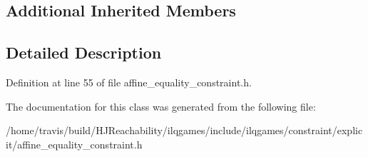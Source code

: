 \subsection*{Additional Inherited Members}


\subsection{Detailed Description}


Definition at line 55 of file affine\+\_\+equality\+\_\+constraint.\+h.



The documentation for this class was generated from the following file\+:\begin{DoxyCompactItemize}
\item 
/home/travis/build/\+H\+J\+Reachability/ilqgames/include/ilqgames/constraint/explicit/affine\+\_\+equality\+\_\+constraint.\+h\end{DoxyCompactItemize}
